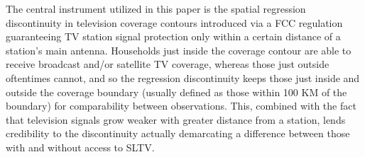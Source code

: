 \documentclass[11pt]{article}
\begin{document}




The central instrument utilized in this paper is the spatial regression discontinuity in television coverage contours introduced via a FCC regulation guaranteeing TV station signal protection only within a certain distance of a station's main antenna. Households just inside the coverage contour are able to receive broadcast and/or satellite TV coverage, whereas those just outside oftentimes cannot, and so the regression discontinuity keeps those just inside and outside the coverage boundary (usually defined as those within 100 KM of the boundary) for comparability between observations. This, combined with the fact that television signals grow weaker with greater distance from a station, lends credibility to the discontinuity actually demarcating a difference between those with and without access to SLTV.
\end{document}
